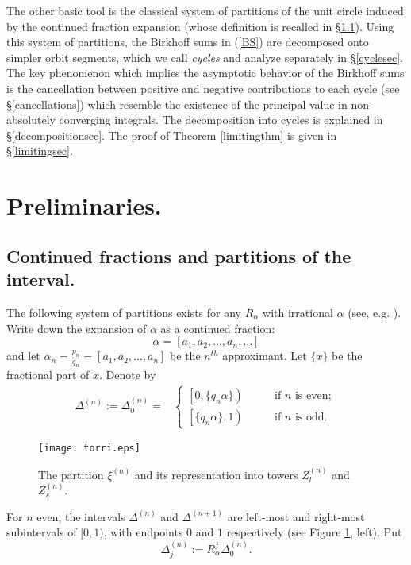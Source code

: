 \documentclass{conm-p-l}
\numberwithin{equation}{section}
\begin{document}
The other basic tool is the classical system of partitions of the
unit circle induced by the continued fraction expansion (whose
definition is recalled in \S \ref{partitionssec}). Using this
system of partitions, the Birkhoff sums in (\ref{BS}) are
decomposed onto simpler orbit segments, which we call
\emph{cycles} and analyze separately in \S\ref{cyclesec}. The key
phenomenon which implies the asymptotic behavior of the Birkhoff
sums is the cancellation between positive and negative contributions
to each cycle (see \S\ref{cancellations}) which resemble the
existence of the principal value 
 in non-absolutely converging
integrals. The decomposition into cycles is explained in
\S\ref{decompositionsec}. The proof of Theorem \ref{limitingthm}
is given in \S\ref{limitingsec}.

\vspace{1mm}
\section{Preliminaries.}\label{preliminariessec}
\subsection{Continued fractions and partitions of the
interval.}
\label{partitionssec} The following system of partitions
exists for any $R_\alpha$ with irrational $\alpha$ (see,
e.g. \cite{Si:top}). Write down the expansion of $\alpha$ as a 
continued fraction: 
\begin{equation*} \alpha = [a_1, a_2, \dots, a_n,  \dots]
\end{equation*}
 and let
$\alpha_n=\frac{p_n}{q_n} = [a_1, a_2, \dots, a_n] $ be the
$n^{th}$ approximant. Let $\{x \}$ be the fractional part of $x$.
Denote by 
\begin{equation*}
\begin{array}{ll}
\Delta^{(n)}:= \Delta^{(n)}_0 = &
\left\{
\begin{array}{ll} \left[ 0,\{ q_n \alpha \} \right) & \qquad \mathrm{if} \,\,  n
\,\,  \mathrm{is}\,\,  \mathrm{even};
\\
 \left[  \{ q_n \alpha \} ,1  \right) & \qquad \mathrm{if} \,\,  n \,\,
\mathrm{is}\,\,  \mathrm{odd}.
\end{array}
\right.
\end{array}
\end{equation*}
\begin{figure}
\centering
\texttt{[image: torri.eps]}
\caption{The partition $\xi^{(n)}$ \label{torri}
and its representation into towers $Z^{(n)}_{l}$ and $Z^{(n)}_{s}$.}
\end{figure} 
For $n$ even, the intervals $\Delta^{(n)}$ and
$\Delta^{(n+1)}$ are left-most and right-most subintervals of
$[0,1)$, with endpoints  $0$ and $1$ respectively (see Figure \ref{torri}, left). 
Put \begin{equation*}
 \Delta^{(n)}_j := R_{\alpha}^j \Delta^{(n)}_0 .
\end{equation*}
\end{document}
